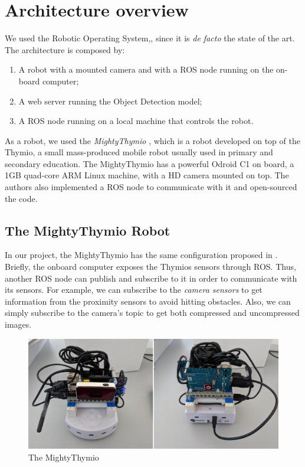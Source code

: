 \documentclass[letterpaper, 10 pt, conference]{ieeeconf}  %
\begin{document}
\section{Architecture overview}
We used the Robotic Operating System,\cite{ROS}, since it is \emph{de facto} the state of the art. The architecture is composed by:
\begin{enumerate}
	\item A robot with a mounted camera and with a ROS node running on the on-board computer;
	\item A web server running the Object Detection model;
	\item A ROS node running on a local machine that controls the robot.
\end{enumerate}
As a robot, we used the \emph{MightyThymio} \cite{guzzi2018eaai}, which is a robot developed on top of the Thymio, a small mass-produced mobile robot usually used in primary and secondary education. The MightyThymio has a powerful Odroid C1 on board, a 1GB quad-core ARM Linux machine, with a HD camera mounted on top. The authors also implemented a ROS node to communicate with it and open-sourced the code.

\subsection*{The MightyThymio Robot}

In our project, the MightyThymio has the same configuration proposed in \cite{guzzi2018eaai}. Briefly, the onboard computer exposes the Thymios sensors through ROS. Thus, another ROS node can publish and subscribe to it in order to communicate with its sensors. For example, we can subscribe to the \emph{camera sensors} to get information from the proximity sensors to avoid hitting obstacles. Also, we can simply subscribe to the camera's topic to get both compressed and uncompressed images. 
\begin{figure}[H]
\centering
\includegraphics[width=\linewidth]{assembled_myt}	
\caption{The MightyThymio}
\end{figure}
\end{document}
